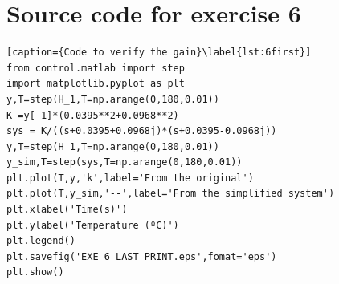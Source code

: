 \documentclass[a4paper]{article}
\begin{document}
\section{Source code for exercise 6}
\begin{lstlisting}[caption={Code to verify the gain}\label{lst:6first}]
from control.matlab import step
import matplotlib.pyplot as plt
y,T=step(H_1,T=np.arange(0,180,0.01))
K =y[-1]*(0.0395**2+0.0968**2)
sys = K/((s+0.0395+0.0968j)*(s+0.0395-0.0968j))
y,T=step(H_1,T=np.arange(0,180,0.01))
y_sim,T=step(sys,T=np.arange(0,180,0.01))
plt.plot(T,y,'k',label='From the original')
plt.plot(T,y_sim,'--',label='From the simplified system')
plt.xlabel('Time(s)')
plt.ylabel('Temperature (ºC)')
plt.legend()
plt.savefig('EXE_6_LAST_PRINT.eps',fomat='eps')
plt.show()
\end{lstlisting}
\end{document}
